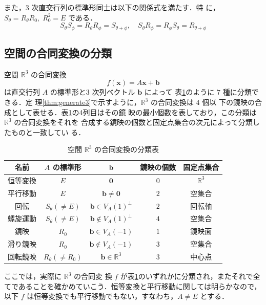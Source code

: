 \documentclass[11pt, uplatex, dvipdfmx, titlepage]{jsarticle}
\theoremstyle{definition}
\begin{document}
また，$3$ 次直交行列の標準形同士は以下の関係式を満たす．特
に，$S_{\theta}= R_{\theta}R_{0}, \; R_0^2=E$ である．
\[
  S_{\theta} S_{\phi} = R_{\theta}R_{\phi}=S_{\theta+\phi}, \quad  
  S_{\theta}R_{\phi} = R_{\phi}S_{\theta} = R_{\theta+\phi}
\]

\newpage

\subsection{空間の合同変換の分類}

空間 $\mathbb{R}^3$ の合同変換
\[
  f(\bm{x}) = A\bm{x} + \bm{b}
\]
は直交行列 $A$ の標準形と$3$ 次列ベクトル $\bm{b}$ によって
表\ref{tab:classification3}のように $7$ 種に分類できる．定
理\ref{thm:generate3}で示すように，$\mathbb{R}^3$ の合同変換は $4$ 個以
下の鏡映の合成として表せる．表\ref{tab:classification3}の4列目はその鏡
映の最小個数を表しており，この分類は $\mathbb{R}^3$ の合同変換をそれを
合成する鏡映の個数と固定点集合の次元によって分類したものと一致してい
る．
\begin{table}[h]
  \centering
  \begin{tabular}[h]{|c|c|c|c|c|}\hline
    名前 & $A$ の標準形 & $\bm{b}$ & 鏡映の個数 & 固定点集合\\ \hline
    恒等変換 & $E$ & $\bm{0}$ & 0 & $\mathbb{R}^3$\\ 
    平行移動 & $E$ & $\bm{b} \neq \bm{0}$ & $2$ & 空集合\\
    回転 & $S_{\theta} (\neq E)$ & $\bm{b} \in V_{A}(1)^{\perp}$  & $2$ & 回転軸\\
    螺旋運動 & $S_{\theta} (\neq E)$ & $\bm{b} \notin V_{A}(1)^{\perp}$ & $4$ &  空集合\\ 
    鏡映 & $R_{0}$ & $\bm{b} \in V_A(-1)$ & $1$ & 鏡映面\\
    滑り鏡映 & $R_{0}$ & $\bm{b} \notin V_A(-1)$ & $3$ & 空集合\\
    回転鏡映 & $R_{\theta} (\neq R_{0})$ & $\bm{b} \in \mathbb{R}^3$ & $3$ &  中心点\\ \hline    
  \end{tabular}
  \caption{空間 $\mathbb{R}^3$ の合同変換の分類表}
  \label{tab:classification3}
\end{table}

ここでは，実際に $\mathbb{R}^3$ の合同変
換 $f$ が表\ref{tab:classification3}のいずれかに分類され，またそれで全
てであることを確かめていこう．恒等変換と平行移動に関しては明らかなので，
以下 $f$ は恒等変換でも平行移動でもない，すなわち，$A \neq E$ とする．
\end{document}
